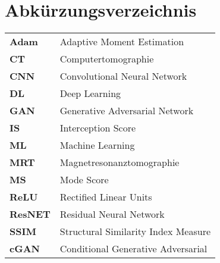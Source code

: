 
\chapter*{Abkürzungsverzeichnis}
\begin{longtable}{ll}
\textbf{Adam} & Adaptive Moment Estimation \\
\textbf{CT} & Computertomographie \\
\textbf{CNN} & Convolutional Neural Network \\
\textbf{DL} & Deep Learning \\
\textbf{GAN}  & Generative Adversarial Network \\ 
\textbf{IS} & Interception Score \\
\textbf{ML} & Machine Learning\\
\textbf{MRT} & Magnetresonanztomographie \\
\textbf{MS} & Mode Score\\
\textbf{ReLU} & Rectified Linear Units\\
\textbf{ResNET} & Residual Neural Network\\
\textbf{SSIM} & Structural Similarity Index Measure\\
\textbf{cGAN} & Conditional Generative Adversarial\\
\end{longtable}

\cleardoublepage